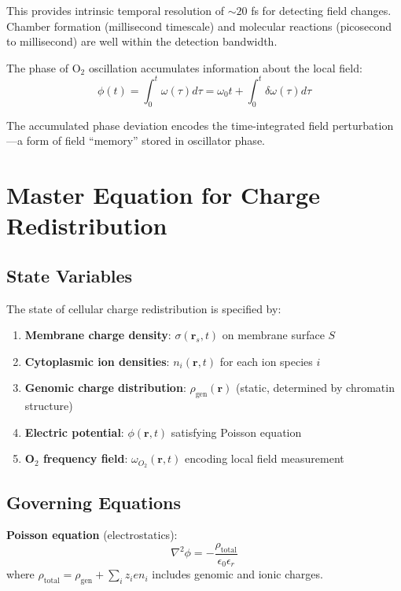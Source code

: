 \documentclass[twocolumn,10pt,aps,prd,superscriptaddress,floatfix,nofootinbib]{revtex4-2}
\theoremstyle{remark}
\begin{document}
This provides intrinsic temporal resolution of $\sim 20$ fs for detecting field changes. Chamber formation (millisecond timescale) and molecular reactions (picosecond to millisecond) are well within the detection bandwidth.

The phase of O$_2$ oscillation accumulates information about the local field:
\begin{equation}
\phi(t) = \int_0^t \omega(\tau) d\tau = \omega_0 t + \int_0^t \delta\omega(\tau) d\tau
\end{equation}

The accumulated phase deviation encodes the time-integrated field perturbation---a form of field ``memory'' stored in oscillator phase.

\section{Master Equation for Charge Redistribution}
\label{sec:dynamics}

\subsection{State Variables}

The state of cellular charge redistribution is specified by:

\begin{enumerate}
\item \textbf{Membrane charge density}: $\sigma(\mathbf{r}_s, t)$ on membrane surface $S$
\item \textbf{Cytoplasmic ion densities}: $n_i(\mathbf{r}, t)$ for each ion species $i$
\item \textbf{Genomic charge distribution}: $\rho_{\mathrm{gen}}(\mathbf{r})$ (static, determined by chromatin structure)
\item \textbf{Electric potential}: $\phi(\mathbf{r}, t)$ satisfying Poisson equation
\item \textbf{O$_2$ frequency field}: $\omega_{O_2}(\mathbf{r}, t)$ encoding local field measurement
\end{enumerate}

\subsection{Governing Equations}

\textbf{Poisson equation} (electrostatics):
\begin{equation}
\nabla^2\phi = -\frac{\rho_{\mathrm{total}}}{\epsilon_0\epsilon_r}
\label{eq:poisson}
\end{equation}
where $\rho_{\mathrm{total}} = \rho_{\mathrm{gen}} + \sum_i z_i e n_i$ includes genomic and ionic charges.
\end{document}
